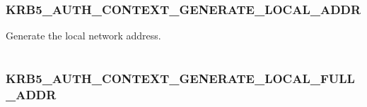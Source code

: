 \documentclass[letterpaper,10pt,english]{sphinxmanual}
\begin{document}
\begin{tabulary}{\linewidth}{|L|L|}
\hline

 & 
\\
\hline\end{tabulary}



\subsubsection{KRB5\_AUTH\_CONTEXT\_GENERATE\_LOCAL\_ADDR}
\label{appdev/refs/macros/KRB5_AUTH_CONTEXT_GENERATE_LOCAL_ADDR::doc}\label{appdev/refs/macros/KRB5_AUTH_CONTEXT_GENERATE_LOCAL_ADDR:krb5-auth-context-generate-local-addr}\label{appdev/refs/macros/KRB5_AUTH_CONTEXT_GENERATE_LOCAL_ADDR:krb5-auth-context-generate-local-addr-data}

\begin{fulllineitems}
\label{appdev/refs/macros/KRB5_AUTH_CONTEXT_GENERATE_LOCAL_ADDR:KRB5_AUTH_CONTEXT_GENERATE_LOCAL_ADDR}
\end{fulllineitems}


Generate the local network address.

\begin{tabulary}{\linewidth}{|L|L|}
\hline

 & 
\\
\hline\end{tabulary}



\subsubsection{KRB5\_AUTH\_CONTEXT\_GENERATE\_LOCAL\_FULL\_ADDR}
\label{appdev/refs/macros/KRB5_AUTH_CONTEXT_GENERATE_LOCAL_FULL_ADDR:krb5-auth-context-generate-local-full-addr}\label{appdev/refs/macros/KRB5_AUTH_CONTEXT_GENERATE_LOCAL_FULL_ADDR:krb5-auth-context-generate-local-full-addr-data}\label{appdev/refs/macros/KRB5_AUTH_CONTEXT_GENERATE_LOCAL_FULL_ADDR::doc}

\begin{fulllineitems}
\label{appdev/refs/macros/KRB5_AUTH_CONTEXT_GENERATE_LOCAL_FULL_ADDR:KRB5_AUTH_CONTEXT_GENERATE_LOCAL_FULL_ADDR}
\end{fulllineitems}
\end{document}
